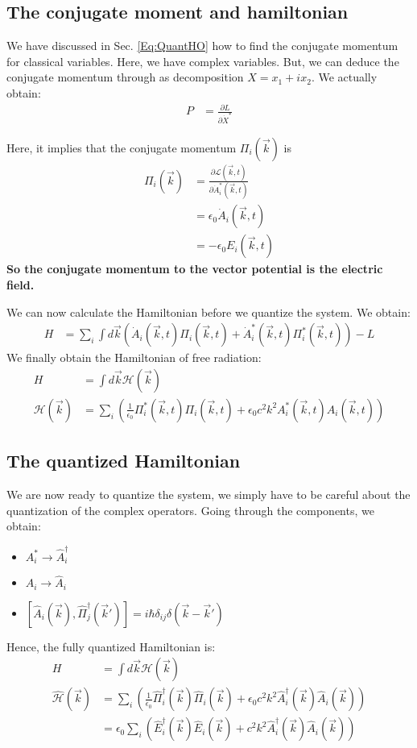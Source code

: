 \documentclass[10pt]{article}
\begin{document}
\subsection{The conjugate moment and hamiltonian}
We have discussed in Sec. \ref{Eq:QuantHO}  how to find the conjugate momentum for classical variables. Here, we have complex variables. But, we can deduce the conjugate momentum through as decomposition $X = x_1 + i x_2$. We actually obtain:
\begin{align}
P &= \frac{\partial L}{\partial \dot{X}^*}
\end{align}

Here, it implies that the conjugate momentum $\Pi_i(\vec{k})$ is 
\begin{align}
\Pi_i(\vec{k}) &= \frac{\partial\mathcal{L}(\vec{k},t)}{\partial \dot{A}^*_i(\vec{k},t)}\\
&= \epsilon_0 \dot{A}_i(\vec{k},t)\\
&= -\epsilon_0 E_i(\vec{k},t)
\end{align}
\textbf{So the conjugate momentum to the vector potential is the electric field.}

We can now calculate the Hamiltonian before we quantize the system. We obtain:
\begin{align}
H &= \sum_i \int d\vec{k}\left(\dot{A}_i(\vec{k},t)\Pi_i(\vec{k},t)+\dot{A}^*_i(\vec{k},t)\Pi^*_i(\vec{k},t)\right)-L
\end{align}
We finally obtain the Hamiltonian of free radiation:
\begin{align}
H &= \int d\vec{k} \mathcal{H}(\vec{k})\\
\mathcal{H}(\vec{k}) &= \sum_i  \left(\frac{1}{\epsilon_0}\Pi_i^*(\vec{k},t)\Pi_i(\vec{k},t)+\epsilon_0c^2k^2 A^*_i(\vec{k},t)A_i(\vec{k},t)\right)
\end{align}

\subsection{The quantized Hamiltonian}
We are now ready to quantize the system, we simply have to be careful about the quantization of the complex operators. Going through the components, we obtain:
\begin{itemize}
\item $A_i^*\rightarrow \hat{A}_i^\dag$
\item $A_i\rightarrow \hat{A}_i$
\item $[\hat{A}_i(\vec{k}),\hat{\Pi}^\dag_j(\vec{k}')]= i\hbar \delta_{ij}\delta(\vec{k}-\vec{k}')$
\end{itemize}
Hence, the fully quantized Hamiltonian is:
\begin{align}
H &= \int d\vec{k} \mathcal{H}(\vec{k})\\
\hat{\mathcal{H}}(\vec{k}) &= \sum_i  \left(\frac{1}{\epsilon_0}\hat{\Pi}_i^\dag(\vec{k})\hat{\Pi}_i(\vec{k})+\epsilon_0c^2k^2 \hat{A}^\dag_i(\vec{k})\hat{A}_i(\vec{k})\right)\\
 &= \epsilon_0 \sum_i  \left(\hat{E}_i^\dag(\vec{k})\hat{E}_i(\vec{k})+c^2k^2 \hat{A}^\dag_i(\vec{k})\hat{A}_i(\vec{k})\right)
\end{align}
\end{document}
